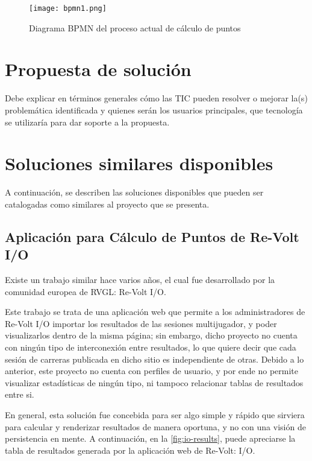 \begin{figure}[H]
  \begin{center}
    \texttt{[image: bpmn1.png]}
  \end{center}
  \caption[Diagrama BPMN del proceso actual de cálculo de puntos]{Diagrama BPMN del proceso actual de cálculo de puntos}
  \label{fig:bpmn}
\end{figure}

\section{Propuesta de solución}
Debe explicar en términos generales cómo las TIC pueden resolver o mejorar la(s) problemática identificada y quienes serán los usuarios principales, que tecnología se utilizaría para dar soporte a la propuesta.

\section{Soluciones similares disponibles}
A continuación, se describen las soluciones disponibles que pueden ser catalogadas como similares al proyecto que se presenta.

\subsection{Aplicación para Cálculo de Puntos de Re-Volt I/O}
Existe un trabajo similar hace varios años, el cual fue desarrollado por la comunidad europea de RVGL: Re-Volt I/O.

Este trabajo se trata de una aplicación web que permite a los administradores de Re-Volt I/O importar los resultados de las sesiones multijugador, y poder visualizarlos dentro de la misma página; sin embargo, dicho proyecto no cuenta con ningún tipo de interconexión entre resultados, lo que quiere decir que cada sesión de carreras publicada en dicho sitio es independiente de otras. Debido a lo anterior, este proyecto no cuenta con perfiles de usuario, y por ende no permite visualizar estadísticas de ningún tipo, ni tampoco relacionar tablas de resultados entre si.

En general, esta solución fue concebida para ser algo simple y rápido que sirviera para calcular y renderizar resultados de manera oportuna, y no con una visión de persistencia en mente. A continuación, en la \autoref{fig:io-results}, puede apreciarse la tabla de resultados generada por la aplicación web de Re-Volt: I/O.

